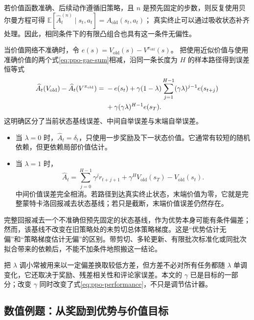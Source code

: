 \documentclass[UTF8,12pt,a4paper,fontset=fandol]{ctexart}
\begin{document}
若价值函数准确、后续动作遵循旧策略，且 $n$ 是预先固定的步数，则反复使用贝尔曼方程可得
$\mathbb E[\widehat A_t^{(n)}\mid s_t,a_t]=A_{\mathrm{old}}(s_t,a_t)$；
真实终止可以通过吸收状态补齐处理。因此，相同条件下的有限凸组合也具有这一条件无偏性。

当价值网络不准确时，令
$e(s)=V_{\mathrm{old}}(s)-V^{\pi_{\mathrm{old}}}(s)$。
把使用近似价值与使用准确价值的两个式\eqref{eq:ppo-gae-sum}相减，沿同一条长度为 $H$ 的样本路径得到误差恒等式
\begin{align}
  \widehat A_t(V_{\mathrm{old}})
  -\widehat A_t(V^{\pi_{\mathrm{old}}})
  ={}&-e(s_t)
  +\gamma(1-\lambda)
    \sum_{j=1}^{H-1}(\gamma\lambda)^{j-1}e(s_{t+j})
  \notag\\
  &+\gamma(\gamma\lambda)^{H-1}e(s_T).
  \label{eq:ppo-gae-value-error}
\end{align}
这明确区分了当前状态基线误差、中间自举误差与末端自举误差。

\begin{itemize}
  \item 当 $\lambda=0$ 时，$\widehat A_t=\delta_t$，只使用一步奖励及下一状态价值。它通常有较短的随机依赖，但更依赖局部价值估计。
  \item 当 $\lambda=1$ 时，
  \[
    \widehat A_t
    =\sum_{j=0}^{H-1}\gamma^j r_{t+j+1}
     +\gamma^H V_{\mathrm{old}}(s_T)
     -V_{\mathrm{old}}(s_t).
  \]
  中间价值误差完全相消。若路径到达真实终止状态，末端价值为零，它就是完整蒙特卡洛回报减去状态基线；若只是截断，末端价值误差仍然存在。
\end{itemize}

完整回报减去一个不准确但预先固定的状态基线，作为优势本身可能有条件偏差；然而，该基线不改变在旧策略处的未剪切总体策略梯度。这是“优势估计无偏”和“策略梯度估计无偏”的区别。带剪切、多轮更新、有限批次标准化或同批次拟合带来的依赖后，不能不加条件地照搬这一结论。

把 $\lambda$ 调小常被用来以一定偏差换取较低方差，但方差不必对所有任务都随 $\lambda$ 单调变化，它还取决于奖励、残差相关性和评论家误差。本文的 $\gamma$ 已是目标的一部分；改变 $\gamma$ 同时改变了式\eqref{eq:ppo-performance}，不只是调节估计器。

\subsection{数值例题：从奖励到优势与价值目标}
\end{document}
